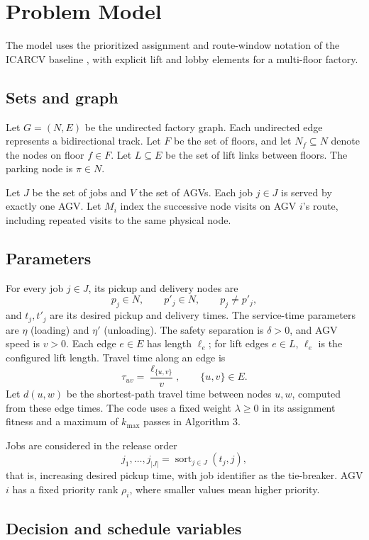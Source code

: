 \section{Problem Model}
\label{sec:model}
The model uses the prioritized assignment and route-window notation of the
ICARCV baseline \cite{guo2024}, with explicit lift and lobby elements for a
multi-floor factory.

\subsection{Sets and graph}

Let $G=(N,E)$ be the undirected factory graph. Each undirected edge represents a
bidirectional track. Let $F$ be the set of floors, and let $N_f\subseteq N$
denote the nodes on floor $f\in F$. Let $L\subseteq E$ be the set of lift links
between floors. The parking node is $\pi\in N$.

Let $J$ be the set of jobs and $V$ the set of AGVs. Each job $j\in J$ is served
by exactly one AGV. Let $M_i$ index the successive node visits on AGV $i$'s
route, including repeated visits to the same physical node.

\subsection{Parameters}

For every job $j\in J$, its pickup and delivery nodes are
\[
  p_j\in N,\qquad p'_j\in N,\qquad p_j\ne p'_j,
\]
and $t_j,t'_j$ are its desired pickup and delivery times. The service-time
parameters are $\eta$ (loading) and $\eta'$ (unloading). The safety separation
is $\delta>0$, and AGV speed is $v>0$. Each edge $e\in E$ has length $\ell_e$;
for lift edges $e\in L$, $\ell_e$ is the configured lift length. Travel time
along an edge is
\[
  \tau_{uv}=\frac{\ell_{\{u,v\}}}{v},\qquad \{u,v\}\in E.
\]
Let $d(u,w)$ be the shortest-path travel time between nodes $u,w$, computed
from these edge times. The code uses a fixed weight $\lambda\ge 0$ in its
assignment fitness and a maximum of $k_{\max}$ passes in Algorithm 3.

Jobs are considered in the release order
\[
  j_1,\ldots,j_{|J|}
  =\operatorname{sort}_{j\in J}(t_j,j),
\]
that is, increasing desired pickup time, with job identifier as the tie-breaker.
AGV $i$ has a fixed priority rank $\rho_i$, where smaller values mean higher
priority.

\subsection{Decision and schedule variables}

